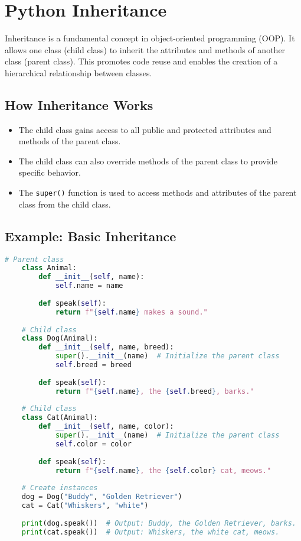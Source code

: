 \section{Python Inheritance}
Inheritance is a fundamental concept in object-oriented programming (OOP). It allows one class (child class) to inherit the attributes and methods of another class (parent class). This promotes code reuse and enables the creation of a hierarchical relationship between classes.

\subsection{How Inheritance Works}
\begin{tcolorbox}[title = {When a class inherits from another:} ,coltitle =black,fonttitle=\large\bfseries,colback=green!5!white,colframe=green!75!black]
	\begin{itemize}
		\item The child class gains access to all public and protected attributes and methods of the parent class.
		\item The child class can also override methods of the parent class to provide specific behavior.
		\item The \texttt{super()} function is used to access methods and attributes of the parent class from the child class.
	\end{itemize}
\end{tcolorbox}



\subsection{Example: Basic Inheritance}
\begin{lstlisting}[language=python, caption={Inheritance Example}]
	# Parent class
	class Animal:
		def __init__(self, name):
			self.name = name
	
		def speak(self):
			return f"{self.name} makes a sound."
	
	# Child class
	class Dog(Animal):
		def __init__(self, name, breed):
			super().__init__(name)  # Initialize the parent class
			self.breed = breed
	
		def speak(self):
			return f"{self.name}, the {self.breed}, barks."
	
	# Child class
	class Cat(Animal):
		def __init__(self, name, color):
			super().__init__(name)  # Initialize the parent class
			self.color = color
		
		def speak(self):
			return f"{self.name}, the {self.color} cat, meows."
	
	# Create instances
	dog = Dog("Buddy", "Golden Retriever")
	cat = Cat("Whiskers", "white")
	
	print(dog.speak())  # Output: Buddy, the Golden Retriever, barks.
	print(cat.speak())  # Output: Whiskers, the white cat, meows.
\end{lstlisting}


